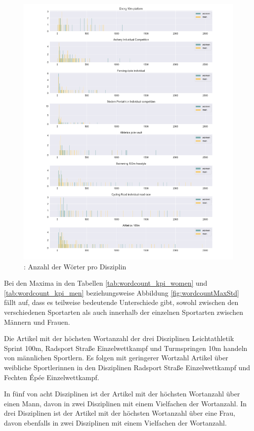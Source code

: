 \documentclass[11pt]{article}
\begin{document}
\begin{figure}
\includegraphics[width=1\textwidth]{figures/wordcount_disciplines_histogram.png}
\caption[Anzahl der Wörter pro Disziplin]{: Anzahl der Wörter pro Disziplin}
\label{fig:wordcountDisciplinesHistogram}
\end{figure}

Bei den Maxima in den Tabellen \ref{tab:wordcount_kpi_women} und \ref{tab:wordcount_kpi_men} beziehungsweise Abbildung \ref{fig:wordcountMaxStd} fällt auf, dass es teilweise bedeutende Unterschiede gibt, sowohl zwischen den verschiedenen Sportarten als auch innerhalb der einzelnen Sportarten zwischen Männern und Frauen. 

Die Artikel mit der höchsten Wortanzahl der drei Disziplinen Leichtathletik Sprint 100m, Radsport Straße Einzelwettkampf und Turmspringen 10m handeln von männlichen Sportlern. Es folgen mit geringerer Wortzahl Artikel über weibliche Sportlerinnen in den Disziplinen Radsport Straße Einzelwettkampf und Fechten Épée Einzelwettkampf. 

In fünf von acht Disziplinen ist der Artikel mit der höchsten Wortanzahl über einen Mann, davon in zwei Disziplinen mit einem Vielfachen der Wortanzahl.
In drei Disziplinen ist der Artikel mit der höchsten Wortanzahl über eine Frau, davon ebenfalls in zwei Disziplinen mit einem Vielfachen der Wortanzahl. 
\end{document}
